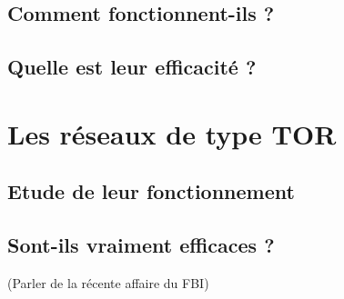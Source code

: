 \documentclass[a4paper,12pt,french]{report}
\begin{document}
\subsection{Comment fonctionnent-ils ?}

\subsection{Quelle est leur efficacité ?}

\section{Les réseaux de type TOR}

\subsection{Etude de leur fonctionnement}

\subsection{Sont-ils vraiment efficaces ?}
(Parler de la récente affaire du FBI)
\end{document}
